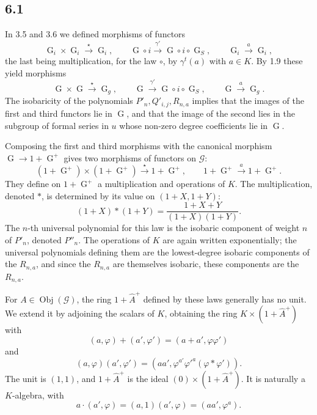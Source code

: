 \documentclass[11pt]{article}
\theoremstyle{plain}
\theoremstyle{definition}
\theoremstyle{remark}
\providecommand{\Go}{\operatorname{G}}
\providecommand{\Goi}{\operatorname{G}_i}
\providecommand{\Got}{\operatorname{G}}
\providecommand{\Gou}{\operatorname{G}}
\providecommand{\us}{_{\!S}}
\providecommand{\Obj}{\operatorname{Obj}}
\begin{document}
\subsection*{6.1}
In 3.5 and 3.6 we defined morphisms of functors
\[
\Goi\times\Goi\xrightarrow{\star}\Goi,
\qquad
\Got\circ i\xrightarrow{\gamma'}\Gou\circ i\circ\Got\us,
\qquad
\Goi\xrightarrow{a}\Goi,
\]
the last being multiplication, for the law $\circ$, by $\gamma^t(a)$ with $a\in K$. By 1.9 these yield morphisms
\[
\Go\times\Go\xrightarrow{\star}\Go_g,
\qquad
\Got\xrightarrow{\gamma'}\Gou\circ i\circ\Got\us,
\qquad
\Go\xrightarrow{a}\Go_g.
\]
The isobaricity of the polynomials $P'_n,Q'_{i,j},R_{n,a}$ implies that the images of the first and third functors lie in $\Go$, and that the image of the second lies in the subgroup of formal series in $u$ whose non-zero degree coefficients lie in $\Got$.

Composing the first and third morphisms with the canonical morphism $\Go\to 1+\Go^+$ gives two morphisms of functors on $\mathcal G$:
\[
(1+\Go^+)\times(1+\Go^+)\xrightarrow{\star}1+\Go^+,
\qquad
1+\Go^+\xrightarrow{a}1+\Go^+.
\]
They define on $1+\Go^+$ a multiplication and operations of $K$. The multiplication, denoted $*$, is determined by its value on $(1+X,1+Y)$:
\begin{equation}\label{eq:6.1.1}
(1+X)*(1+Y)=\frac{1+X+Y}{(1+X)(1+Y)}.
\end{equation}
The $n$-th universal polynomial for this law is the isobaric component of weight $n$ of $P'_n$, denoted $P''_n$. The operations of $K$ are again written exponentially; the universal polynomials defining them are the lowest-degree isobaric components of the $R_{n,a}$, and since the $R_{n,a}$ are themselves isobaric, these components are the $R_{n,a}$.

For $A\in\Obj(\mathcal G)$, the ring $1+\widehat A^+$ defined by these laws generally has no unit. We extend it by adjoining the scalars of $K$, obtaining the ring $K\times(1+\widehat A^+)$ with
\[
(a,\varphi)+(a',\varphi')=(a+a',\varphi\varphi')
\]
and
\begin{equation}\label{eq:6.1.2}
(a,\varphi)(a',\varphi')=(aa',\varphi^{a'}\varphi'^{a}(\varphi*\varphi')).
\end{equation}
The unit is $(1,1)$, and $1+\widehat A^+$ is the ideal $(0)\times(1+\widehat A^+)$. It is naturally a $K$-algebra, with
\begin{equation}\label{eq:6.1.3}
a\cdot(a',\varphi)=(a,1)(a',\varphi)=(aa',\varphi^a).
\end{equation}
\end{document}
